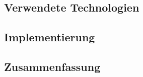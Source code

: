 \begin{spacing}{1}
\chapter{Verwendete Technologien}\label{chapter:tech}
\end{spacing}


\begin{spacing}{1}
\chapter{Implementierung}\label{chapter:implementation}
\end{spacing}


\begin{spacing}{1}
\chapter{Zusammenfassung}
\end{spacing}


\newpage
{}
\setcounter{page}{\value{RPages}}

\glsnogroupskiptrue
\printglossary[title=Glossar,toctitle=Glossar] %
\listoffigures
\listoftables
\appendix
{}

